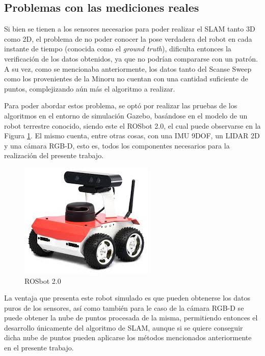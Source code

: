 \else
\subsection{Problemas con las mediciones reales}
Si bien se tienen a los sensores necesarios para poder realizar el SLAM tanto 3D como 2D, el problema de no poder conocer la pose verdadera del robot en cada instante de tiempo (conocida como el \textit{ground truth}), dificulta entonces la verificación de los datos obtenidos, ya que no podrían compararse con un patrón. A su vez, como se mencionaba anteriormente, los datos tanto del Scanse Sweep como los provenientes de la Minoru no cuentan con una cantidad suficiente de puntos, complejizando aún más el algoritmo a realizar.

Para poder abordar estos problema, se optó por realizar las pruebas de los algoritmos en el entorno de simulación Gazebo, basándose en el modelo de un robot terrestre conocido, siendo este el ROSbot 2.0, el cual puede observarse en la Figura \ref{fig:rosbot2_0}. El mismo cuenta, entre otras cosas, con una IMU 9DOF, un LIDAR 2D y una cámara RGB-D, esto es, todos los componentes necesarios para la realización del presente trabajo.

\begin{figure}[!ht]
    \centering
    \includegraphics[scale=1]{Img/ROSbot2_0.jpg}
    \caption{ROSbot 2.0}
    \label{fig:rosbot2_0}
\end{figure}

La ventaja que presenta este robot simulado es que pueden obtenerse los datos puros de los sensores, así como también para le caso de la cámara RGB-D se puede obtener la nube de puntos procesada de la misma, permitiendo entonces el desarrollo únicamente del algoritmo de SLAM, aunque si se quiere conseguir dicha nube de puntos pueden aplicarse los métodos mencionados anteriormente en el presente trabajo.



